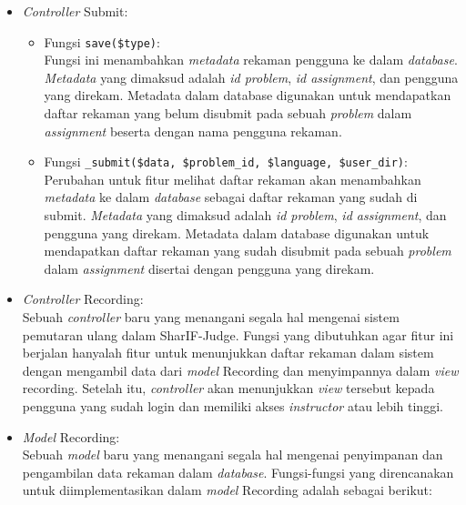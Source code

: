 \begin{itemize}
    \item \textit{Controller} Submit:
          \begin{itemize}
              \item Fungsi \verb|save($type)|: \\
                    Fungsi ini menambahkan \textit{metadata} rekaman pengguna ke dalam \textit{database}. \textit{Metadata} yang dimaksud adalah \textit{id problem}, \textit{id assignment}, dan pengguna yang direkam. Metadata dalam database digunakan untuk mendapatkan daftar rekaman yang belum disubmit pada sebuah \textit{problem} dalam \textit{assignment} beserta dengan nama pengguna rekaman.
              \item Fungsi \verb|_submit($data, $problem_id, $language, $user_dir)|: \\
                    Perubahan untuk fitur melihat daftar rekaman akan menambahkan \textit{metadata} ke dalam \textit{database} sebagai daftar rekaman yang sudah di submit. \textit{Metadata} yang dimaksud adalah \textit{id problem}, \textit{id assignment}, dan pengguna yang direkam. Metadata dalam database digunakan untuk mendapatkan daftar rekaman yang sudah disubmit pada sebuah \textit{problem} dalam \textit{assignment} disertai dengan pengguna yang direkam.
          \end{itemize}
    \item \textit{Controller} Recording: \\
          Sebuah \textit{controller} baru yang menangani segala hal mengenai sistem pemutaran ulang dalam SharIF-Judge. Fungsi yang dibutuhkan agar fitur ini berjalan hanyalah fitur untuk menunjukkan daftar rekaman dalam sistem dengan mengambil data dari \textit{model} Recording dan menyimpannya dalam \textit{view} recording. Setelah itu, \textit{controller} akan menunjukkan \textit{view} tersebut kepada pengguna yang sudah login dan memiliki akses \textit{instructor} atau lebih tinggi.
    \item \textit{Model} Recording: \\
          Sebuah \textit{model} baru yang menangani segala hal mengenai penyimpanan dan pengambilan data rekaman dalam \textit{database}. Fungsi-fungsi yang direncanakan untuk diimplementasikan dalam \textit{model} Recording adalah sebagai berikut:
          \begin{itemize}

\end{itemize}
\end{itemize}
